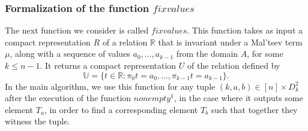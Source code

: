 \documentclass{article}
\theoremstyle{definition}
\theoremstyle{theorem}
\theoremstyle{theorem}
\theoremstyle{remark}
\theoremstyle{remark}
\theoremstyle{example}
\theoremstyle{notation}
\theoremstyle{theorem}
\begin{document}
\subsubsection{Formalization of the function $fixvalues$}
The next function we consider is called $fixvalues$. This function takes as input a compact representation $R$ of a relation $\mathbb{R}$ that is invariant under a Mal'tsev term $\mu$, along with a sequence of values $a_0, \ldots, a_{k-1}$ from the domain $A$, for some $k \leq n - 1$. It returns a compact representation $U$ of the relation defined by
$$
\mathbb{U} = \{t \in \mathbb{R} : \pi_0 t = a_0, \ldots, \pi_{k-1} t = a_{k-1}\}.
$$
In the main algorithm, we use this function for any tuple $(k, a, b) \in [n] \times D_k^2$ after the execution of the function $nonempty^1$, in the case where it outputs some element $T_a$, in order to find a corresponding element $T_b$ such that together they witness the tuple.
\end{document}
